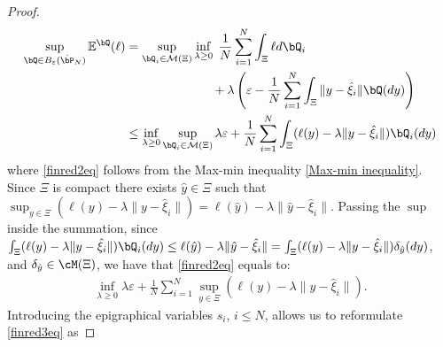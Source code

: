 \documentclass[11pt,a4paper,oneside,openany]{book}
\numberwithin{definition}{section}
\numberwithin{theorem}{section}
\numberwithin{problem}{section}
\begin{document}
\begin{proof}
\begin{align}
  &\begin{aligned}
    \mathllap{\sup_{\bQ \in B_{\varepsilon}(\hat \bP_N)}\mathbb{E}^{\bQ}(\ell)} &= \sup_{\bQ_i \in \mathcal{M}(\Xi)} \inf_{\lambda \geq 0} \; \frac{1}{N} \sum_{i=1}^N \int_{\Xi}\ell d\bQ_i\\
      &\qquad \qquad \qquad \quad + \lambda\left(\varepsilon - \frac{1}{N} \sum_{i=1}^N \int_{\Xi}\|y-\hat \xi_i\|\bQ(dy)\right)
  \end{aligned}\\\label{finred2eq}
   \phantom{\sup_{\bQ \in B_{\varepsilon}(\hat \bP_N)}\mathbb{E}^{\bQ}(\ell)  } & \leq \inf_{\lambda \geq 0 }\sup_{\bQ_i \in \mathcal{M}(\Xi)} \lambda \varepsilon + \frac{1}{N} \sum_{i=1}^N\int_{\Xi}(\ell(y)-\lambda \|y - \hat \xi_i\|) \bQ_i(dy)
\end{align}
where \eqref{finred2eq} follows from the Max-min inequality \eqref{Max-min inequality}. Since $\Xi$ is compact there exists $\hat y \in \Xi$ such that $\sup_{y \in \Xi}(\ell(y) - \lambda \|y-\hat \xi_i \|) = \ell(\hat y) - \lambda \|\hat y-\hat \xi_i \| $.
Passing the $\sup$ inside the summation, since $\int_{\Xi}(\ell(y) - \lambda \|y-\hat \xi_i \|)\bQ_i(dy) \leq \ell(\hat y) - \lambda \|\hat y-\hat \xi_i \| = \int_{\Xi}(\ell(y) - \lambda \|y-\hat \xi_i \|)\delta_{\hat y}(dy)$, and $\delta_{\hat y} \in \cM(\Xi)$, we have that \eqref{finred2eq} equals to:
\begin{align}
       \label{finred3eq}
     \inf_{\lambda \geq 0}\lambda \varepsilon + \frac{1}{N} \sum_{i=1}^N \sup_{y \in \Xi}(\ell(y) - \lambda\|y - \hat \xi_i\|).
\end{align}
    Introducing the epigraphical variables $s_i$, $i \leq N$,  allows us to reformulate \eqref{finred3eq} as


\end{proof}
\end{document}
